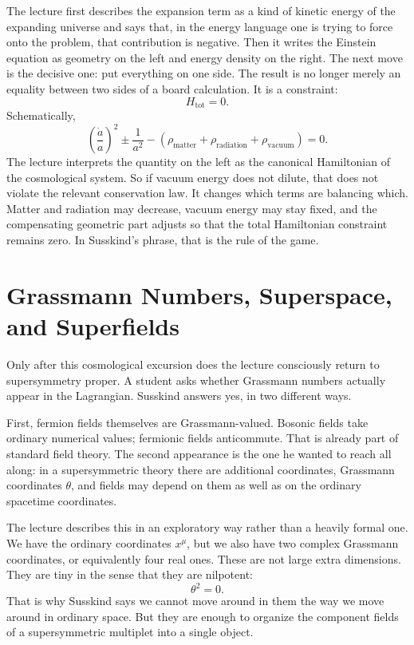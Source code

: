 The lecture first describes the expansion term as a kind of kinetic energy of the expanding universe and says that, in the energy language one is trying to force onto the problem, that contribution is negative. Then it writes the Einstein equation as geometry on the left and energy density on the right. The next move is the decisive one: put everything on one side. The result is no longer merely an equality between two sides of a board calculation. It is a constraint:
\begin{equation}
H_{\mathrm{tot}}=0.
\end{equation}
Schematically,
\begin{equation}
\left(\frac{\dot a}{a}\right)^2
\pm
\frac{1}{a^2}
-
\left(
\rho_{\mathrm{matter}}+\rho_{\mathrm{radiation}}+\rho_{\mathrm{vacuum}}
\right)
=0.
\end{equation}
The lecture interprets the quantity on the left as the canonical Hamiltonian of the cosmological system. So if vacuum energy does not dilute, that does not violate the relevant conservation law. It changes which terms are balancing which. Matter and radiation may decrease, vacuum energy may stay fixed, and the compensating geometric part adjusts so that the total Hamiltonian constraint remains zero. In Susskind's phrase, that is the rule of the game.

\section{Grassmann Numbers, Superspace, and Superfields}

Only after this cosmological excursion does the lecture consciously return to supersymmetry proper. A student asks whether Grassmann numbers actually appear in the Lagrangian. Susskind answers yes, in two different ways.

First, fermion fields themselves are Grassmann-valued. Bosonic fields take ordinary numerical values; fermionic fields anticommute. That is already part of standard field theory. The second appearance is the one he wanted to reach all along: in a supersymmetric theory there are additional coordinates, Grassmann coordinates \(\theta\), and fields may depend on them as well as on the ordinary spacetime coordinates.

The lecture describes this in an exploratory way rather than a heavily formal one. We have the ordinary coordinates \(x^\mu\), but we also have two complex Grassmann coordinates, or equivalently four real ones. These are not large extra dimensions. They are tiny in the sense that they are nilpotent:
\begin{equation}
\theta^2=0.
\end{equation}
That is why Susskind says we cannot move around in them the way we move around in ordinary space. But they are enough to organize the component fields of a supersymmetric multiplet into a single object.

